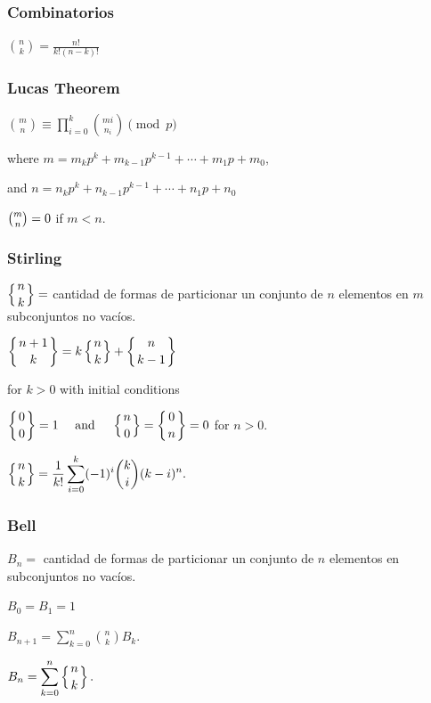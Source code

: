 {{\subsubsection{Combinatorios}
{
\(\displaystyle \binom{n}{k} = \frac{n!}{k!(n-k)!} \)
}

\subsubsection{Lucas Theorem}
{
    \(\displaystyle {\binom {m}{n}}\equiv \prod_{i=0}^{k}{\binom {m{i}}{n_{i}}}{\pmod{p}}\)

where \({\displaystyle m=m_{k}p^{k}+m_{k-1}p^{k-1}+\cdots +m_{1}p+m_{0},}\)

and \({\displaystyle n=n_{k}p^{k}+n_{k-1}p^{k-1}+\cdots +n_{1}p+n_{0}}\)

\({\displaystyle {\tbinom {m}{n}}=0}\) if \(m < n\).


}
\subsubsection{Stirling}
{
\(\displaystyle \left\{{n \atop k}\right\} = \) cantidad de formas de particionar un conjunto de \(n\) elementos en \(m\) subconjuntos no vacíos.

\(\displaystyle \left\{{n+1\atop k}\right\} = k \left\{{ n \atop k }\right\} + \left\{{n\atop k-1}\right\}\)

for \(k > 0\) with initial conditions

\({\displaystyle \left\{{0 \atop 0}\right\}=1\quad {\mbox{ and }}\quad \left\{{n \atop 0}\right\}=\left\{{0 \atop n}\right\}=0}\)
for \(n > 0\).




\( {\displaystyle \left\{{n \atop k}\right\}={\frac {1}{k!}}\sum_{i=0}^{k}(-1)^{i}{\binom {k}{i}}(k-i)^{n}.} \)
}
\subsubsection{Bell}
{
\( {\displaystyle B_{n}=} \) cantidad de formas de particionar un conjunto de \(n\) elementos en subconjuntos no vacíos.

\( {\displaystyle B_0= B_1 = 1} \)

\( {\displaystyle B_{n+1}=\sum_{k=0}^{n} \binom{n}{k} B_k.} \) 

\( {\displaystyle B_{n}=\sum _{k=0}^{n}\left\{{n \atop k}\right\}.} \) 


}}}
